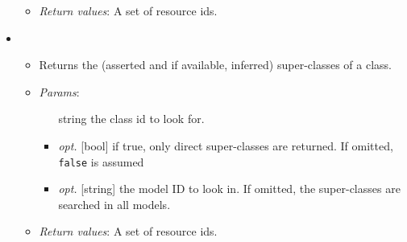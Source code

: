 \begin{itemize}
\begin{itemize}
\item  \emph{Return values}: A set of resource ids.
\end{itemize}

\item  {}
\begin{itemize}
\item  Returns the (asserted and if available, inferred) super-classes of a class.
\item  \emph{Params}:
\begin{itemize}
\item  [string] the class id to look for.
\item  \emph{opt.} [bool] if true, only direct super-classes are returned. If omitted, \texttt{false} is assumed 
\item  \emph{opt.} [string] the model ID to look in. If omitted, the super-classes are searched in all models. 
\end{itemize}

\item  \emph{Return values}: A set of resource ids.
\end{itemize}

\end{itemize}

